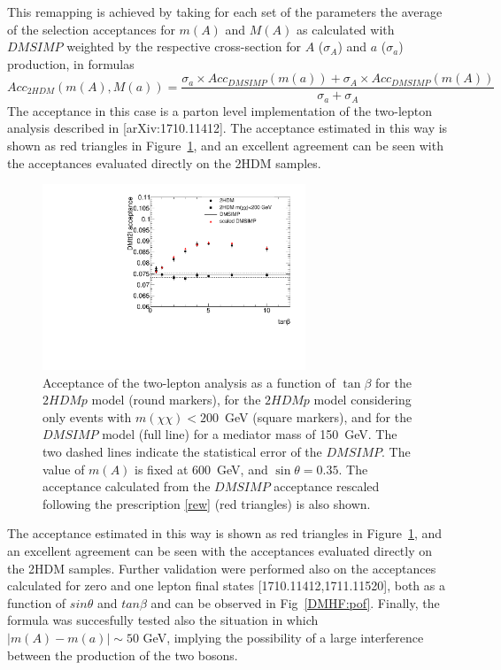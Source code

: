 This remapping is achieved by
taking for each set of the parameters the 
average of the selection acceptances for $m(A)$ and $M(A)$ as 
calculated with $DMSIMP$ weighted by the respective 
cross-section for $A$ ($\sigma_A$) and $a$ 
($\sigma_a$) production, in formulas
\begin{equation}
Acc_{2HDM}(m(A),M(a))=\frac{\sigma_a \times Acc_{DMSIMP}(m(a))+
\sigma_A \times Acc_{DMSIMP}(m(A))}{\sigma_a+\sigma_A}
\label{rew}
\end{equation}
The acceptance in this case is a parton level implementation of the
two-lepton analysis described in [arXiv:1710.11412].
The acceptance estimated in this way is shown as red triangles 
in Figure~\ref{fig:tbfin}, and an excellent agreement 
can be seen with the acceptances evaluated directly on the 2HDM 
samples. 
\begin{figure}[htb]
\begin{center}
\includegraphics[width=0.7\textwidth]{texinputs/04_grid/figures/DMHF/plotacc_tb.pdf}
\caption{Acceptance of the two-lepton analysis as a function of $\tan\beta$ 
for the $2HDMp$ model (round markers), for the $2HDMp$ model 
considering only events with $m(\chi\chi)<200$~GeV (square markers),
and for the $DMSIMP$ model (full line) for a mediator
mass of 150~GeV. The two dashed lines indicate
the statistical error of the $DMSIMP$. The value of $m(A)$ is fixed at 
600~GeV, and $\sin\theta=0.35$. 
The acceptance 
calculated from the $DMSIMP$ acceptance rescaled following the 
prescription \ref{rew} (red triangles) is also shown.}
\label{fig:tbfin}
\end{center}
\end{figure}
The acceptance estimated in this way is shown as red triangles 
in Figure~\ref{fig:tbfin}, and an excellent agreement 
can be seen with the acceptances evaluated directly on the 2HDM 
samples. Further validation were performed also on the acceptances calculated for zero and one lepton final states [1710.11412,1711.11520], 
both as a function of $sin\theta$ and $tan\beta$ and can be observed in Fig~\ref{DMHF:pof}.
Finally, the formula was succesfully tested also the situation in
which $|m(A)-m(a)| \sim 50$ GeV, 
implying the possibility of a large interference
between the production of the two bosons.

